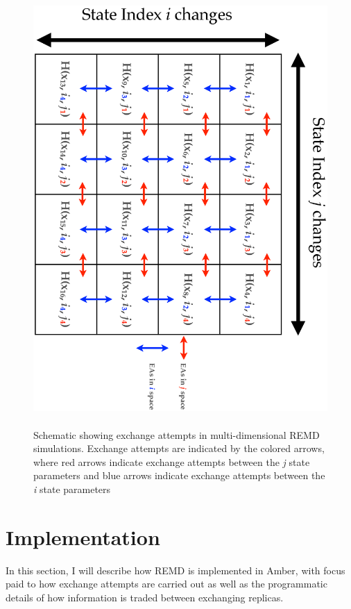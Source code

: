 \begin{figure}
   \includegraphics[height=6.5in, angle=90]{MultiDREMD.ps}
   \caption[Schematic showing exchange attempts in multi-dimensional REMD
            simulations. Exchange attempts are indicated by the colored arrows]
           {Schematic showing exchange attempts in multi-dimensional REMD
            simulations. Exchange attempts are indicated by the colored arrows,
            where red arrows indicate exchange attempts between the \emph{j}
            state parameters and blue arrows indicate exchange attempts between
            the \emph{i} state parameters}
   \label{fig5:MultiDREMD}
\end{figure}

\section{Implementation}

In this section, I will describe how REMD is implemented in Amber, with focus
paid to how exchange attempts are carried out as well as the programmatic
details of how information is traded between exchanging replicas.

